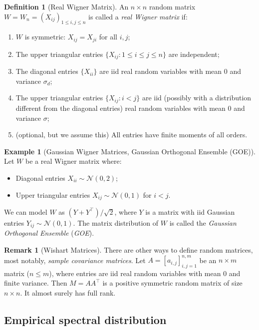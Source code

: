 \documentclass[letterpaper,11pt,oneside,reqno]{article}
\numberwithin{equation}{section}
\theoremstyle{definition}
\newtheorem{definition}[proposition]{Definition}
\newtheorem{remark}[proposition]{Remark}
\newtheorem{example}[proposition]{Example}
\begin{document}
\begin{definition}[Real Wigner Matrix]
An $n \times n$ random matrix $W=W_n = (X_{ij})_{1 \leq i,j \leq n}$ is called a \emph{real Wigner matrix} if:
\begin{enumerate}
    \item $W$ is symmetric: $X_{ij} = X_{ji}$ for all $i,j$;
    \item The upper triangular entries $\{X_{ij}: 1 \leq i \leq j \leq n\}$ are independent;
    \item The diagonal entries $\{X_{ii}\}$ are iid real random variables with mean $0$ and variance $\sigma_d$;
    \item The upper triangular entries $\{X_{ij}: i < j\}$ are iid
			(possibly with a distribution different from the diagonal entries) real random variables
			with mean $0$ and variance $\sigma$;
		\item (optional, but we assume this) All entries have finite moments of all orders.
\end{enumerate}
\end{definition}

\begin{example}[Gaussian Wigner Matrices, Gaussian Orthogonal Ensemble (GOE)]
Let $W$ be a real Wigner matrix where:
\begin{itemize}
    \item Diagonal entries $X_{ii} \sim \mathcal{N}(0, 2)$;
		\item Upper triangular entries $X_{ij} \sim \mathcal{N}(0, 1)$ for $i < j$.
\end{itemize}
We can model $W$ as $(Y+Y^\top)/\sqrt{2}$,
where $Y$ is a matrix with iid Gaussian entries $Y_{ij} \sim \mathcal{N}(0, 1)$.
The matrix distribution of $W$ is called
the \emph{Gaussian Orthogonal Ensemble} (\emph{GOE}).
\end{example}

\begin{remark}[Wishart Matrices]
	\label{rmk:wishart-matrices}
	There are other ways to define random matrices,
	most notably, \emph{sample covariance matrices}.
	Let $A = [a_{i,j}]_{i,j=1}^{n,m}$ be an $n \times m$ matrix ($n \leq m$), where entries are iid real random variables with
	mean $0$ and finite variance.
	Then $M = AA^\top$ is a positive symmetric random matrix of
	size $n \times n$. It almost surely has full rank.
\end{remark}


\subsection{Empirical spectral distribution}
\end{document}
